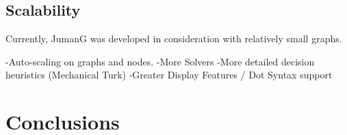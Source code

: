 \documentclass{article}
\begin{document}
\subsection{Scalability}
Currently, JumanG was developed in consideration with relatively small graphs.


-Auto-scaling on graphs and nodes.
-More Solvers
-More detailed decision heuristics (Mechanical Turk)
-Greater Display Features / Dot Syntax support





\section{Conclusions}





\end{document}
